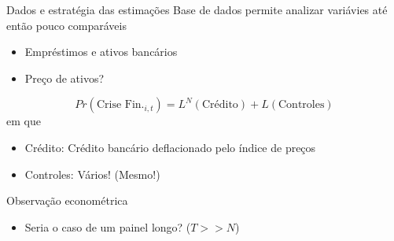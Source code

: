 \documentclass[presentation]{beamer}
\begin{document}
\begin{frame}[label={sec:org37b40a6}]{Dados e estratégia das estimações}
Base de dados permite analizar variávies até então pouco comparáveis

\begin{itemize}
\item Empréstimos e ativos bancários
\item Preço de ativos? \cite{jordaGreatMortgagingHousing2016}
\end{itemize}


$$
Pr(\text{Crise Fin.}_{i,t}) = L^{N}(\text{Crédito}) + L(\text{Controles})
$$
em que
\begin{itemize}
\item \alert{Crédito:} Crédito bancário deflacionado pelo índice de preços
\item \alert{Controles:} Vários! (Mesmo!)
\end{itemize}

\begin{block}{Observação econométrica}
\begin{itemize}
\item Seria o caso de um painel longo? (\(T>>N\))
\end{itemize}
\end{block}
\end{frame}
\end{document}
